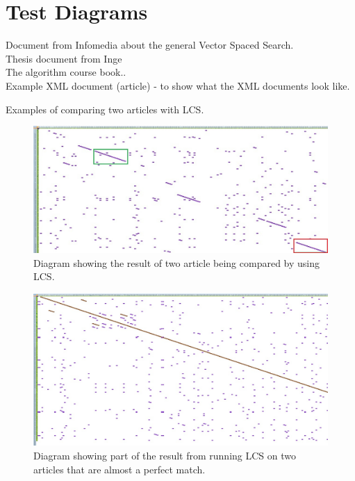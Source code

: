\chapter{Test Diagrams}

Document from Infomedia about the general Vector Spaced Search.\\
Thesis document from Inge\\
The algorithm course book..\\
Example XML document (article) - to show what the XML documents look like.

Examples of comparing two articles with LCS.

\begin{figure}
	\includegraphics[scale=0.65]{figures/LcsExample}
	\caption{Diagram showing the result of two article being compared by using LCS.}
\end{figure}

\begin{figure}
	\includegraphics[scale=0.5]{figures/PerfectMatch}
	\caption{Diagram showing part of the result from running LCS on two articles that are almost a perfect match.}
\end{figure}

